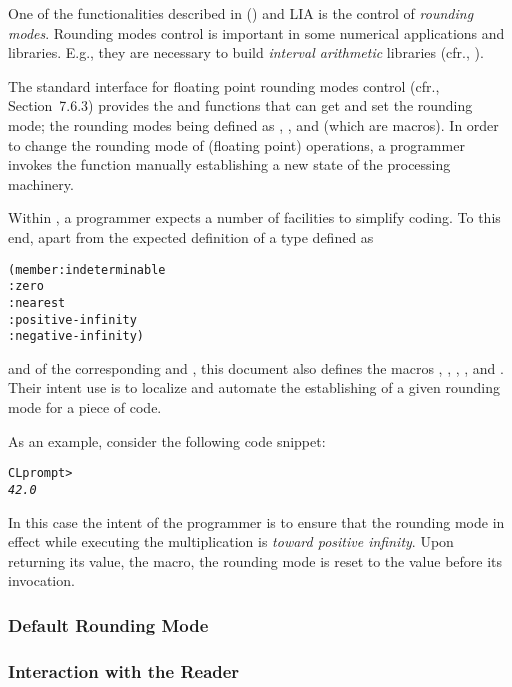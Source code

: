 \documentclass[../Description.tex]{subfiles}
\begin{document}
One of the functionalities described in \IEEEFPStd{} (\IECFPStd{}) and
LIA is the control of \emph{rounding modes}.  Rounding modes control
is important in some numerical applications and libraries.  E.g., they
are necessary to build \emph{interval arithmetic} libraries (cfr.,
\cite{hickey:interval:2001,kulisch:complete:2009,revol:introIEEEIA:2017}).

The \CLang{} standard interface for floating point rounding modes
control (cfr., \cite{2018:C18} Section~7.6.3) provides the
 and  functions that can get and set
the rounding mode; the rounding modes being defined as
, ,  and
 (which are \CLang{} macros).  In order to change
the rounding mode of (floating point) operations, a \CLang{}
programmer invokes the  function manually establishing
a new state of the processing machinery.

Within \CL{}, a programmer expects a number of facilities to simplify
coding.  To this end, apart from the expected definition of a
 type defined as
\begin{alltt}
(member :indeterminable
        :zero
        :nearest
        :positive-infinity
        :negative-infinity)
\end{alltt}
and of the corresponding  and
, this document also defines the macros
, , ,
, and .  Their intent use is
to localize and automate the establishing of a given rounding mode for
a piece of code.

\vspace*{3mm}

\noindent
As an example, consider the following code snippet:
\begin{alltt}
CL prompt> 
\textit{42.0}
\end{alltt}
In this case the intent of the programmer is to ensure that the
rounding mode in effect while executing the multiplication is
\emph{toward positive infinity}.  Upon returning its value, the
 macro, the rounding mode is reset to the value
before its invocation.

\subsubsection{Default Rounding Mode}



\subsubsection{Interaction with the \CL{} Reader}


\end{document}
